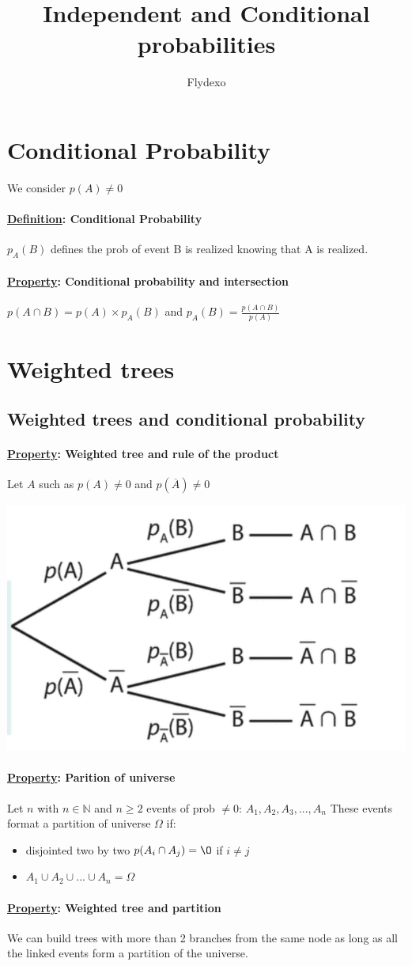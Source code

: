 \documentclass{article}
\title{Independent and Conditional probabilities}
\author{Flydexo}
\newcommand{\definition}[1]{\paragraph*{\underline{Definition}: #1}}
\newcommand{\property}[1]{\paragraph*{\underline{Property}: #1}}
\begin{document}
\maketitle
\tableofcontents
\section{Conditional Probability}
We consider $p(A) \ne 0$
\definition{Conditional Probability}
$p_A(B)$ defines the prob of event B is realized knowing that A is realized.
\property{Conditional probability and intersection}
$p(A \cap B) = p(A) \times p_A(B)$ and $p_A(B) = \frac{p(A\cap B)}{p(A)}$
\section{Weighted trees}
\subsection{Weighted trees and conditional probability}
\property{Weighted tree and rule of the product}
Let $A$ such as $p(A) \ne 0$ and $p(\overline{A}) \ne 0$
\begin{center}
    \includegraphics[scale=0.35]{weighted_tree.png}
\end{center}
\property{Parition of universe}
Let $n$ with $n \in \mathbb{N}$ and $n \ge 2$ events of prob $\ne 0$: $A_1,A_2,A_3,...,A_n$ These events format a partition of universe $\Omega$ if:
\begin{itemize}
    \item disjointed two by two $p(A_i \cap A_j) = \O$ if $i \ne j$
    \item $A_1 \cup A_2 \cup ... \cup A_n = \Omega$
\end{itemize}
\property{Weighted tree and partition}
We can build trees with more than 2 branches from the same node as long as all the linked events form a partition of the universe. 
\end{document}
